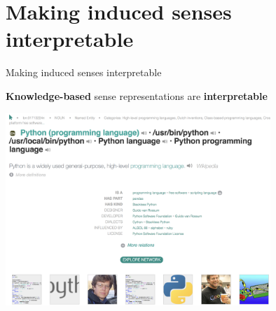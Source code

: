 \section{Making induced senses interpretable}


\begin{frame}{ Making induced senses interpretable }

\vspace{-1em}

\textbf{Knowledge-based} sense representations are \alert{\textbf{interpretable}}
	\begin{center}
	\includegraphics[width=0.75\textwidth]{figures/babelnet}
	\end{center}


\end{frame}


